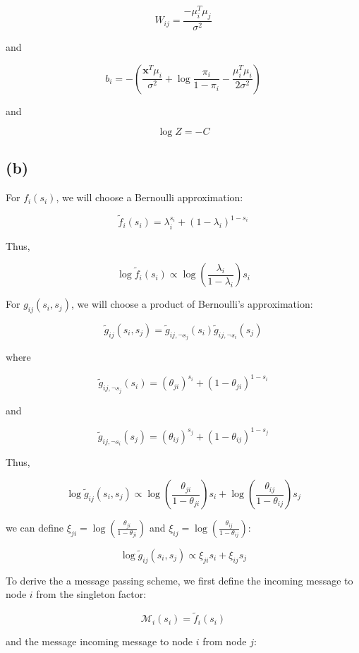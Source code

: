 \documentclass[12pt]{article}
\begin{document}
\[W_{ij} = \frac{- \mu_i^T \mu_j}{\sigma^2}\]

and

\[b_i = -\left(\frac{\textbf{x}^T \mu_i}{\sigma^2} +\log\frac{\pi_i}{1-\pi_i} - \frac{\mu_i^T \mu_i}{2\sigma^2}\right)\]

and

\[\log Z = -C \]


\subsection*{(b)}

For $f_i(s_i)$, we will choose a Bernoulli approximation:

\[\tilde{f}_i(s_i) = \lambda_i^{s_i} + (1-\lambda_i)^{1-s_i}\]


Thus,

\[\log \tilde{f}_i(s_i) \propto \log \left(\frac{\lambda_i}{1-\lambda_i} \right)s_i\]

For $g_{ij}(s_i, s_j)$, we will choose a product of Bernoulli's approximation:

\[\tilde{g}_{ij}(s_i, s_j) = \tilde{g}_{ij, \neg s_j}(s_i)\tilde{g}_{ij, \neg s_i}(s_j)\]

where

\[\tilde{g}_{ij, \neg s_j}(s_i) = (\theta_{ji})^{s_i} + (1-\theta_{ji})^{1-s_i}\]

and

\[\tilde{g}_{ij, \neg s_i}(s_j) = (\theta_{ij})^{s_j} + (1-\theta_{ij})^{1-s_j}\]

Thus,

\[\log \tilde{g}_{ij}(s_i, s_j) \propto \log \left(\frac{\theta_{ji}}{1-\theta_{ji}} \right) s_i + \log \left(\frac{\theta_{ij}}{1-\theta_{ij}} \right) s_j\]

we can define $\xi_{ji} = \log \left(\frac{\theta_{ji}}{1-\theta_{ji}} \right)$ and $\xi_{ij} = \log \left(\frac{\theta_{ij}}{1-\theta_{ij}} \right)$:

\[\log \tilde{g}_{ij}(s_i, s_j) \propto \xi_{ji} s_i + \xi_{ij} s_j\]


To derive the a message passing scheme, we first define the incoming message to node $i$ from the singleton factor:

\[\mathcal{M}_{i}(s_i) = \tilde{f}_i(s_i)\]

and the message incoming message to node $i$ from node $j$:

\end{document}
